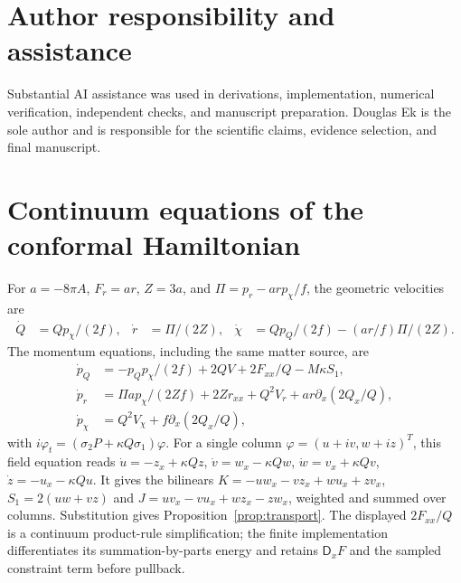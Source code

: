 \documentclass[11pt]{article}
\begin{document}
\section*{Author responsibility and assistance}
Substantial AI assistance was used in derivations, implementation, numerical
verification, independent checks, and manuscript preparation. Douglas Ek
is the sole author and is responsible for the scientific claims, evidence
selection, and final manuscript.

\appendix
\section{Continuum equations of the conformal Hamiltonian}\label{app:rates}
For $a=-8\pi A$, $F_r=ar$, $Z=3a$, and
$\Pi=p_r-ar p_\chi/f$, the geometric velocities are
\begin{align}
\dot Q&=Qp_\chi/(2f),&
\dot r&=\Pi/(2Z),&
\dot\chi&=Qp_Q/(2f)-(ar/f)\Pi/(2Z).
\end{align}
The momentum equations, including the same matter source, are
\begin{align}
\dot p_Q&=-p_Qp_\chi/(2f)+2QV+2F_{xx}/Q-M\kappa S_1,\\
\dot p_r&=\Pi a p_\chi/(2Zf)+2Zr_{xx}+Q^2V_r
 +ar\partial_x(2Q_x/Q),\\
\dot p_\chi&=Q^2V_\chi+f\partial_x(2Q_x/Q),
\end{align}
with $i\varphi_t=(\sigma_2P+\kappa Q\sigma_1)\varphi$.
For a single column $\varphi=(u+iv,w+iz)^T$, this field equation reads
$\dot u=-z_x+\kappa Qz$, $\dot v=w_x-\kappa Qw$,
$\dot w=v_x+\kappa Qv$, $\dot z=-u_x-\kappa Qu$.
It gives the bilinears
$K=-uw_x-vz_x+wu_x+zv_x$,
$S_1=2(uw+vz)$ and
$J=uv_x-vu_x+wz_x-zw_x$, weighted and summed over columns.
Substitution gives Proposition~\ref{prop:transport}.
The displayed $2F_{xx}/Q$ is a continuum product-rule simplification;
the finite implementation differentiates its summation-by-parts energy
and retains $\mathsf D_xF$ and the sampled constraint term before pullback.



\end{document}
